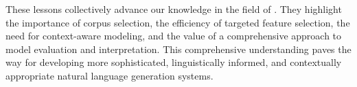 These lessons collectively advance our knowledge in the field of \context. They highlight the importance of corpus selection, the efficiency of targeted feature selection, the need for context-aware modeling, and the value of a comprehensive approach to model evaluation and interpretation. This comprehensive understanding paves the way for developing more sophisticated, linguistically informed, and contextually appropriate natural language generation systems.

